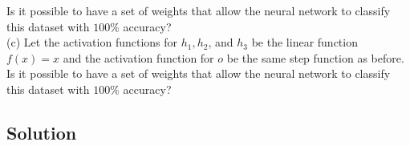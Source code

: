 Is it possible to have a set of weights that allow the neural network to classify this dataset with \( 100 \% \) accuracy?\\
(c) Let the activation functions for \( h_{1}, h_{2} \), and \( h_{3} \) be the linear function \( f(x)=x \) and the activation function for \( o \) be the same step function as before. Is it possible to have a set of weights that allow the neural network to classify this dataset with \( 100 \% \) accuracy?

\subsection*{Solution}
